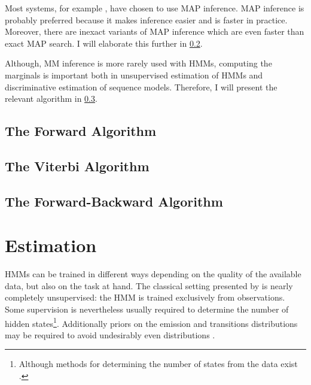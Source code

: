 Most systems, for example \cite{Church1988,Brants2000,Halacsy2007},
have chosen to use MAP inference. MAP inference is probably preferred
because it makes inference easier and is faster in practice. Moreover,
there are inexact variants of MAP inference which are even faster than
exact MAP search. I will elaborate this further in \ref{hmm-viterbi}.

Although, MM inference is more rarely used with HMMs, computing the
marginals is important both in unsupervised estimation of HMMs and
discriminative estimation of sequence models. Therefore, I will
present the relevant algorithm in \ref{hmm-fw-bw}.
 
\subsection{The Forward Algorithm}

\subsection{The Viterbi Algorithm}
\label{hmm-viterbi}

\subsection{The Forward-Backward Algorithm}
\label{hmm-fw-bw}
\section{Estimation}

HMMs can be trained in different ways depending on the quality of the
available data, but also on the task at hand. The classical setting
presented by \cite{Rabiner1989} is nearly completely unsupervised: the
HMM is trained exclusively from observations. Some supervision is
nevertheless usually required to determine the number of hidden
states\footnote{Although methods for determining the number of states
  from the data exist \citep{foo}.}. Additionally priors on the
emission and transitions distributions may be required to avoid
undesirably even distributions
\citep{Cutting1992,Johnson2007}.


